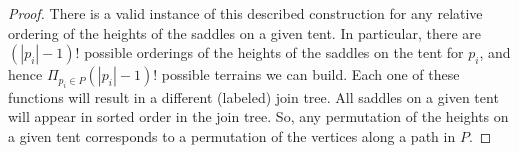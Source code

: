 \documentclass[11pt]{article}
\theoremstyle{definition}
\begin{document}
\begin{proof}
 There is a valid instance of this described construction for any relative ordering of the heights of the saddles on a given tent.  
 In particular, there are $(|p_i|-1)!$ possible orderings of the heights of the saddles on the tent for $p_i$, and hence $\Pi_{p_i\in P} (|p_i|-1)!$ possible 
 terrains we can build.  Each one of these functions will result in a different (labeled) join tree. All saddles on a given tent will appear in sorted order in the join tree.
 So, any permutation of the heights on a given tent corresponds to a permutation of the vertices along a path in $P$.
\end{proof}

\end{document}
